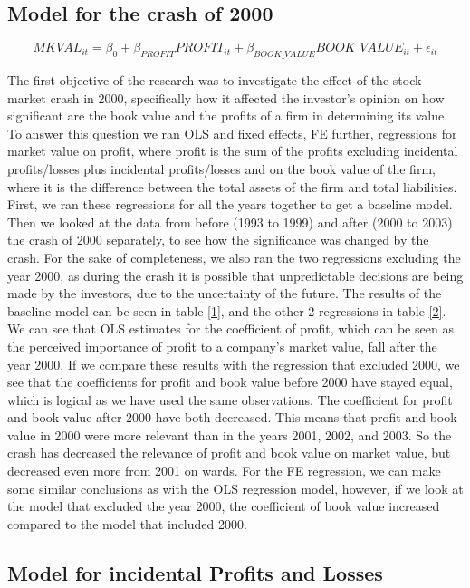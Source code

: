 \documentclass[11pt, letterpaper]{article}
\begin{document}
\subsection{Model for the crash of 2000}
\[MKVAL_{it}=\beta_{0}+\beta_{PROFIT}PROFIT_{it}+\beta_{BOOK\_VALUE}BOOK\_VALUE_{it}+\epsilon_{it}\]

The first objective of the research was to investigate the effect of the stock market crash in 2000, specifically how it affected the investor’s opinion on how significant are the book value and the profits of a firm in determining its value. To answer this question we ran OLS and fixed effects, FE further,  regressions for market value on profit, where profit is the sum of the profits excluding incidental profits/losses plus incidental profits/losses and on the book value of the firm, where it is the difference between the total assets of the firm and total liabilities. 
First, we ran these regressions for all the years together to get a baseline model. Then we looked at the data from before (1993 to 1999) and after (2000 to 2003) the crash of 2000 separately, to see how the significance was changed by the crash. For the sake of completeness, we also ran the two regressions excluding the year 2000, as during the crash it is possible that unpredictable decisions are being made by the investors, due to the uncertainty of the future. The results of the baseline model can be seen in table \ref{1}, and the other 2 regressions in table \ref{2}. We can see that OLS estimates for the coefficient of profit, which can be seen as the perceived importance of profit to a company's market value, fall after the year 2000. If we compare these results with the regression that excluded 2000, we see that the coefficients for profit and book value before 2000 have stayed equal, which is logical as we have used the same observations. The coefficient for profit and book value after 2000 have both decreased. This means that profit and book value in 2000 were more relevant than in the years 2001, 2002, and 2003. So the crash has decreased the relevance of profit and book value on market value, but decreased even more from 2001 on wards. For the FE regression, we can make some similar conclusions as with the OLS regression model, however, if we look at the model that excluded the year 2000, the coefficient of book value increased compared to the model that included 2000.

\newpage
\subsection{Model for incidental Profits and Losses}
\end{document}
